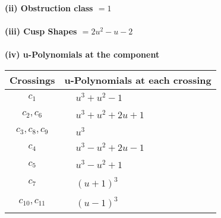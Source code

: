 \documentclass[1p]{elsarticle_modified}
\theoremstyle{definition}
\begin{document}
\flushleft \textbf{(ii) Obstruction class $= 1$}\\~\\
\flushleft \textbf{(iii) Cusp Shapes $= 2 u^2- u-2$}\\~\\
\newpage\renewcommand{\arraystretch}{1}
\flushleft \textbf{(iv) u-Polynomials at the component}\newline \\
\begin{tabular}{m{50pt}|m{274pt}}
Crossings & \hspace{64pt}u-Polynomials at each crossing \\
\hline $$\begin{aligned}c_{1}\end{aligned}$$&$\begin{aligned}
&u^3+u^2-1
\end{aligned}$\\
\hline $$\begin{aligned}c_{2},c_{6}\end{aligned}$$&$\begin{aligned}
&u^3+u^2+2 u+1
\end{aligned}$\\
\hline $$\begin{aligned}c_{3},c_{8},c_{9}\end{aligned}$$&$\begin{aligned}
&u^3
\end{aligned}$\\
\hline $$\begin{aligned}c_{4}\end{aligned}$$&$\begin{aligned}
&u^3- u^2+2 u-1
\end{aligned}$\\
\hline $$\begin{aligned}c_{5}\end{aligned}$$&$\begin{aligned}
&u^3- u^2+1
\end{aligned}$\\
\hline $$\begin{aligned}c_{7}\end{aligned}$$&$\begin{aligned}
&(u+1)^3
\end{aligned}$\\
\hline $$\begin{aligned}c_{10},c_{11}\end{aligned}$$&$\begin{aligned}
&(u-1)^3
\end{aligned}$\\
\hline
\end{tabular}\\~\\
\end{document}
